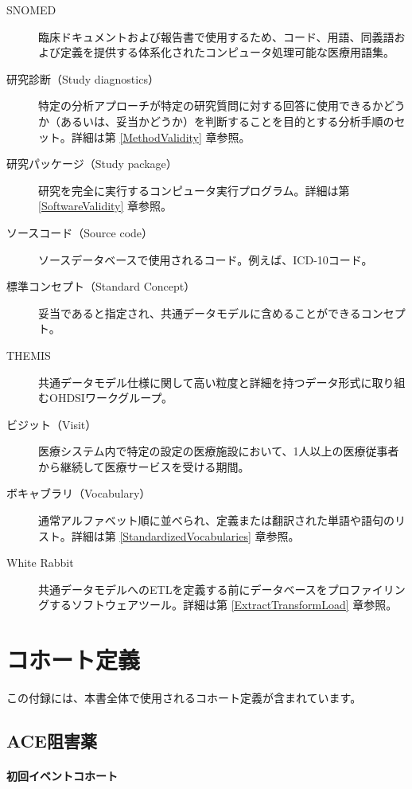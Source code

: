 \documentclass[
  11pt]{book}
\theoremstyle{definition}
\theoremstyle{definition}
\theoremstyle{definition}
\theoremstyle{definition}
\theoremstyle{remark}
\begin{document}
\begin{description}
\item[SNOMED]
臨床ドキュメントおよび報告書で使用するため、コード、用語、同義語および定義を提供する体系化されたコンピュータ処理可能な医療用語集。
\item[研究診断（Study diagnostics）]
特定の分析アプローチが特定の研究質問に対する回答に使用できるかどうか（あるいは、妥当かどうか）を判断することを目的とする分析手順のセット。詳細は第 \ref{MethodValidity} 章参照。
\item[研究パッケージ（Study package）]
研究を完全に実行するコンピュータ実行プログラム。詳細は第 \ref{SoftwareValidity} 章参照。
\item[ソースコード（Source code）]
ソースデータベースで使用されるコード。例えば、ICD-10コード。
\item[標準コンセプト（Standard Concept）]
妥当であると指定され、共通データモデルに含めることができるコンセプト。
\item[THEMIS]
共通データモデル仕様に関して高い粒度と詳細を持つデータ形式に取り組むOHDSIワークグループ。
\item[ビジット（Visit）]
医療システム内で特定の設定の医療施設において、1人以上の医療従事者から継続して医療サービスを受ける期間。
\item[ボキャブラリ（Vocabulary）]
通常アルファベット順に並べられ、定義または翻訳された単語や語句のリスト。詳細は第 \ref{StandardizedVocabularies} 章参照。
\item[White Rabbit]
共通データモデルへのETLを定義する前にデータベースをプロファイリングするソフトウェアツール。詳細は第 \ref{ExtractTransformLoad} 章参照。
\end{description}

\chapter{コホート定義}\label{CohortDefinitions}

この付録には、本書全体で使用されるコホート定義が含まれています。

\section{ACE阻害薬}\label{AceInhibitors}

\subsubsection*{初回イベントコホート}\label{ux521dux56deux30a4ux30d9ux30f3ux30c8ux30b3ux30dbux30fcux30c8}
\end{document}
